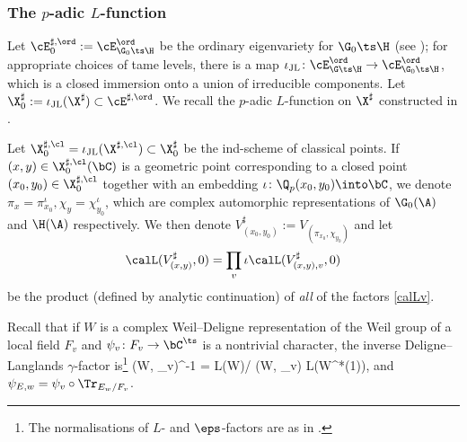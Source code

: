 \subsubsection{The $p$-adic $L$-function} 
 Let $\cE_{0}^{\sharp, \ord}:= \cE_{\G_{0}\ts\H}^{\ord} $ be the ordinary eigenvariety for $\G_{0}\ts\H$ (see \cite{hida-adv,hida-LF}); for appropriate  choices of tame levels,  there is a map $\iota_{\rm JL}\colon \cE^{\ord}_{\G\ts\H} \to \cE_{\G_{0}\ts \H}^{\ord}$, which is a closed immersion onto a union of irreducible components.
Let $\X_{0}^{\sharp}:=\iota_{\rm JL}(\X^{\sharp})\subset \cE^{\sharp, \ord}$.  We recall the $p$-adic $L$-function on $\X^{\sharp}$ constructed in \cite{dd-pLf}.


Let $\X_{0}^{\sharp, \cl} = \iota_{\rm JL}(\X_{}^{\sharp, \cl}) \subset \X_{0}^{\sharp}$ be the ind-scheme of classical points.
If $(x,y)\in \X_{0}^{\sharp, \cl}(\bC)$ is a geometric point corresponding to a closed point  $(x_{0}, y_{0})\in \X_{0}^{\sharp,\cl}$ together with an embedding   $\iota\colon \Q_{p}(x_{0}, y_{0}) \into \bC$, we denote $\pi_{x} =\pi_{x_{0}}^{\iota}, \chi_{y}=\chi_{y_{0}}^{\iota}$, which are  complex automorphic representations of $\G_{0}(\A)$ and $\H(\A)$ respectively. We then  denote $V_{(x_{0},y_{0})}^{\sharp}:= V_{(\pi_{x_{0}}, \chi_{y_{0}})}$ and let
$$\calL(V_{(x, y)}^{\sharp}, 0)= \prod_{v}\iota \calL(V_{(x, y),v}^{\sharp},0)
$$ be the product (defined by analytic continuation) of \emph{all} of the factors \eqref{calLv}.


Recall that if $W$ is a complex Weil--Deligne representation of the Weil group of a local field $F_{v}$ and $\psi_{v}\colon F_{v}\to \bC^{\ts}$ is a nontrivial character,  the inverse Deligne--Langlands $\gamma $-factor is\footnote{The normalisations of $L$- and $\eps$-factors are as in \cite{tate-nt}.}
\beq {} \gamma(W, \psi_{v})^{-1} = {L(W)/ \eps(W, \psi_{v}) L(W^{*}(1))}, \eeq
and  $\psi_{E, w}=\psi_{v}\circ \Tr_{E_{w}/F_{v}}$.

